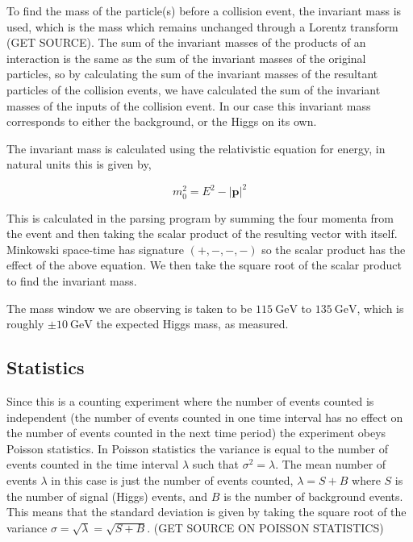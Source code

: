 \documentclass[11pt]{amsart}
\begin{document}
\begin{multicols}{2}
To find the mass of the particle(s) before a collision event, the invariant mass is used, which is the mass which remains unchanged through a Lorentz transform (GET SOURCE). The sum of the invariant masses of the products of an interaction is the same as the sum of the invariant masses of the original particles, so by calculating the sum of the invariant masses of the resultant particles of the collision events, we have calculated the sum of the invariant masses of the inputs of the collision event. In our case this invariant mass corresponds to either the background, or the Higgs on its own.

The invariant mass is calculated using the relativistic equation for energy, in natural units this is given by,

\begin{equation}
  \label{eq:invariantmass}
  m_0^2 = E^2 - {|\mathbf{p}|}^2
\end{equation}

This is calculated in the parsing program by summing the four momenta from the event and then taking the scalar product of the resulting vector with itself. Minkowski space-time has signature $(+, -, -, -)$ so the scalar product has the effect of the above equation. We then take the square root of the scalar product to find the invariant mass. \cite{kinematics}

The mass window we are observing is taken to be $\SI{115}{\giga\electronvolt}$ to $\SI{135}{\giga\electronvolt}$, which is roughly $\pm \SI{10}{\giga\electronvolt}$ the expected Higgs mass, as measured. \cite{Higgs}

\subsection{Statistics}

Since this is a counting experiment where the number of events counted is independent (the number of events counted in one time interval has no effect on the number of events counted in the next time period) the experiment obeys Poisson statistics. In Poisson statistics the variance is equal to the number of events counted in the time interval $\lambda$ such that $\sigma^2 = \lambda$. The mean number of events $\lambda$ in this case is just the number of events counted, $\lambda = S + B$ where $S$ is the number of signal (Higgs) events, and $B$ is the number of background events. This means that the standard deviation is given by taking the square root of the variance $\sigma = \sqrt{\lambda} = \sqrt{S + B}$. (GET SOURCE ON POISSON STATISTICS)


\end{multicols}
\end{document}

